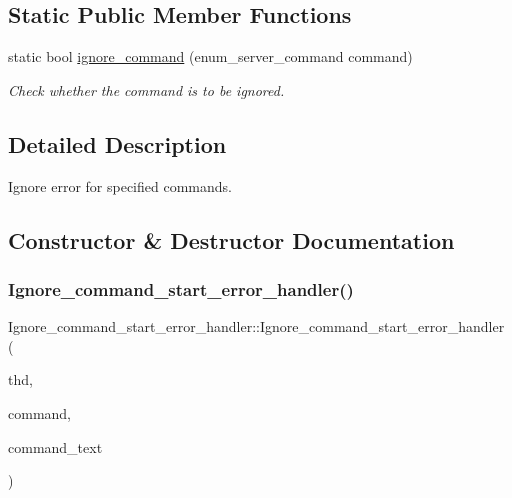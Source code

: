 \subsection*{Static Public Member Functions}
\begin{DoxyCompactItemize}
\item 
static bool \mbox{\hyperlink{classIgnore__command__start__error__handler_afa03128280356fc46b16d9bb7c0a0aad}{ignore\+\_\+command}} (enum\+\_\+server\+\_\+command command)
\begin{DoxyCompactList}\small\item\em Check whether the command is to be ignored. \end{DoxyCompactList}\end{DoxyCompactItemize}


\subsection{Detailed Description}
Ignore error for specified commands. 

\subsection{Constructor \& Destructor Documentation}
\mbox{\label{classIgnore__command__start__error__handler_a1a819f9bc574bb3d9e4f61c28af67582}} 
\subsubsection{\texorpdfstring{Ignore\+\_\+command\+\_\+start\+\_\+error\+\_\+handler()}{Ignore\_command\_start\_error\_handler()}}
{\footnotesize\ttfamily Ignore\+\_\+command\+\_\+start\+\_\+error\+\_\+handler\+::\+Ignore\+\_\+command\+\_\+start\+\_\+error\+\_\+handler (\begin{DoxyParamCaption}\item[{T\+HD $\ast$}]{thd,  }\item[{enum\+\_\+server\+\_\+command}]{command,  }\item[{const char $\ast$}]{command\+\_\+text }\end{DoxyParamCaption})\hspace{0.3cm}{\ttfamily [inline]}}



